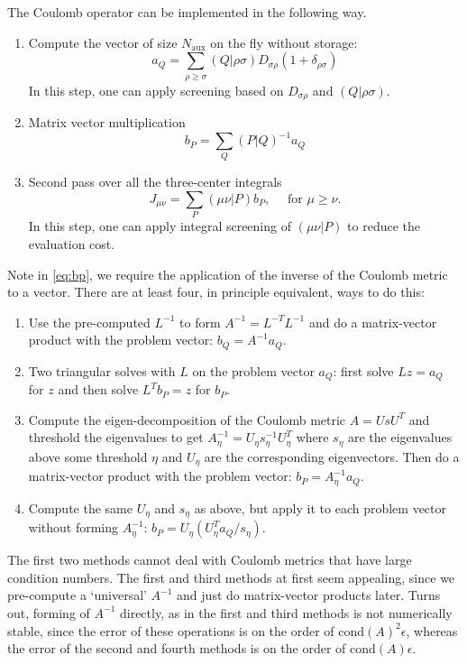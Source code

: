 \documentclass[aip,preprint]{revtex4-1}
\begin{document}
The Coulomb operator can be implemented in the following way.
\begin{enumerate}
    \item Compute the vector of size $N_\mathrm{aux}$ on the fly without storage:
\begin{equation}
a_Q = \sum_{\rho \geq \sigma} (Q|\rho \sigma) D_{\sigma \rho} (1+\delta_{\rho \sigma})
\end{equation}
In this step, one can apply screening based on $D_{\sigma \rho}$ and $(Q|\rho \sigma)$. 

    \item Matrix vector multiplication
\begin{equation}
\label{eq:bp}
b_P = \sum_{Q} (P|Q)^{-1} a_Q
\end{equation}
    \item Second pass over all the three-center integrals
\begin{equation}
J_{\mu \nu} = \sum_{P} (\mu \nu | P) b_P, \quad \text{ for } \mu \geq \nu.
\end{equation}
In this step, one can apply integral screening of $(\mu \nu | P)$ to reduce the evaluation cost.
\end{enumerate}

Note in \cref{eq:bp}, we require the application of the inverse of the Coulomb metric to a vector.
There are at least four, in principle equivalent, ways to do this:
\begin{enumerate}
    \item Use the pre-computed $L^{-1}$ to form $A^{-1}=L^{-T} L^{-1}$ and do a matrix-vector product with the problem vector: $b_Q = A^{-1} a_Q$.
    \item Two triangular solves with $L$ on the problem vector $a_Q$: first solve $L z = a_Q$ for $z$ and then solve $L^T b_P = z$ for $b_P$.
    \item Compute the eigen-decomposition of the Coulomb metric $A = U s U^T$ and threshold the eigenvalues to get $A_{\eta}^{-1} = U_{\eta} s_{\eta}^{-1} U_{\eta}^T$ where $s_{\eta}$ are the eigenvalues above some threshold $\eta$ and $U_{\eta}$ are the corresponding eigenvectors. Then do a matrix-vector product with the problem vector: $b_P = A_{\eta}^{-1}a_Q$.
    \item Compute the same $U_{\eta}$ and $s_{\eta}$ as above, but apply it to each problem vector without forming $A_{\eta}^{-1}$: $b_P = U_{\eta} (U_{\eta}^T a_Q / s_{\eta})$.
\end{enumerate}
The first two methods cannot deal with Coulomb metrics that have large condition numbers. The first and third methods at first seem appealing, since we pre-compute a `universal' $A^{-1}$ and just do matrix-vector products later.
Turns out, forming of $A^{-1}$ directly, as in the first and third methods is not numerically stable, since the error of these operations is on the order of $\text{cond}(A)^2\epsilon$, whereas the error of the second and fourth methods is on the order of $\text{cond}(A)\epsilon$.
\end{document}
